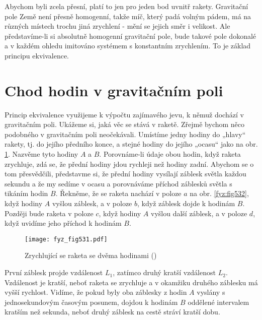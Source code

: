 {    Abychom byli zcela přesní, platí to jen pro jeden bod uvnitř rakety. Gravitační pole Země není 
    přesně homogenní, takže míč, který padá volným pádem, má na různých místech trochu jiná 
    zrychlení - mění se jejich směr i velikost. Ale představíme-li si absolutně homogenní 
    gravitační pole, bude takové pole dokonalé a v každém ohledu imitováno systémem s konstantním 
    zrychlením. To je základ principu ekvivalence.
    
  \section{Chod hodin v gravitačním poli}\label{fyz:IIchapXLIIsecVI}
    Princip ekvivalence využijeme k výpočtu zajímavého jevu, k němuž dochází v gravitačním poli. 
    Ukážeme si, jaká věc se stává v raketě. Zřejmě bychom něco podobného v gravitačním poli 
    neočekávali. Umístíme jedny hodiny do „hlavy“ rakety, tj. do jejího předního konce, a stejné 
    hodiny do jejího „ocasu“ jako na obr. \ref{fyz:fig531}. Nazvěme tyto hodiny \(A\) a \(B\). 
    Porovnáme-li údaje obou hodin, když raketa zrychluje, zdá se, že přední hodiny jdou rychleji 
    než hodiny zadní. Abychom se o tom přesvědčili, představme si, že přední hodiny vysílají 
    záblesk světla každou sekundu a že my sedíme v ocasu a porovnáváme příchod záblesků světla s 
    tikáním hodin \(B\). Řekněme, že se raketa nachází v poloze \(a\) na obr. \ref{fyz:fig532}, 
    když hodiny \(A\) vyšlou záblesk, a v poloze \(b\), když záblesk dojde k hodinám \(B\). Později 
    bude raketa v poloze \(c\), když hodiny \(A\) vyšlou další záblesk, a v poloze \(d\), když 
    uvidíme jeho příchod k hodinám \(B\).
    

    \begin{figure}[ht!] %
      \centering
      \texttt{[image: fyz\_fig531.pdf]}
      \caption{Zrychlující se raketa se dvěma hodinami
               (\cite[s.~786]{Feynman02})}
      \label{fyz:fig531}
    \end{figure}
    
    První záblesk projde vzdálenost \(L_1\), zatímco druhý kratší vzdálenost \(L_2\). Vzdálenost je 
    kratší, neboť raketa se zrychluje a v okamžiku druhého záblesku má vyšší rychlost. Vidíme, že 
    pokud byly oba záblesky z hodin \(A\) vyslány s jednosekundovým časovým posunem, dojdou k 
    hodinám \(B\) oddělené intervalem kratším než sekunda, neboť druhý záblesk na cestě stráví 
    kratší dobu.
    
}
